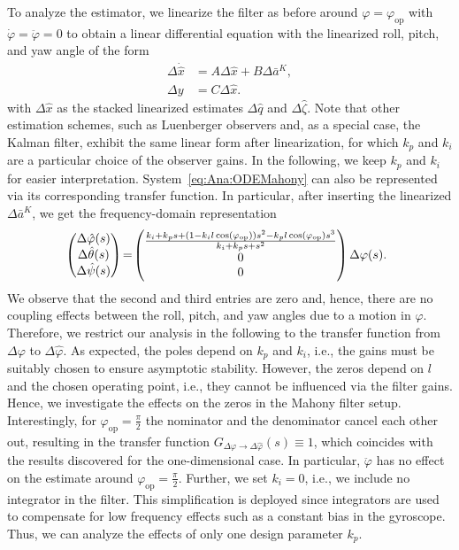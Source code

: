 To analyze the estimator, we linearize the filter as before around $\varphi=\varphi_{\mathrm{op}}$ with $\dot{\varphi}=\ddot\varphi=0$ to obtain a linear differential equation with the linearized roll, pitch, and yaw angle of the 
form
\begin{equation}\label{eq:Ana:ODEMahony}
	\begin{aligned}
		\Delta\dot{\hat{x}} 	&= A\Delta \hat{x} + B \Delta \bar{a}^K, \\
		\Delta y 		&= C\Delta \hat{x}.		
	\end{aligned}
\end{equation}
with $\Delta\hat{x}$ as the stacked linearized estimates $\Delta\hat{q}$ and $\Delta\hat{\zeta}$. Note that other estimation schemes, such as Luenberger observers and, as a special case, the Kalman filter, exhibit the same linear form after linearization, for which $k_p$ and $k_i$ are a particular choice of the observer gains.
In the following, we keep $k_p$ and $k_i$ for easier interpretation.
System~\eqref{eq:Ana:ODEMahony} can also be represented via its corresponding transfer function. 
In particular, after inserting the linearized $\Delta \bar{a}^K$, we get the frequency-domain representation%
\small
\begin{equation*}
	\hspace*{-0.015\linewidth}
	\begin{pmatrix}
		\Delta \hat{\varphi}(s) \\
		\Delta \hat{\theta}(s) \\
		\Delta \hat{\psi}(s)
	\end{pmatrix} 
	\!=\! 
	\begin{pmatrix}
		\frac{k_i + k_ps + (1-k_il\cos(\varphi_{\mathrm{op}}))s^2 - k_pl\cos(\varphi_{\mathrm{op}})s^3}{k_i + k_ps + s^2} \\ 
		0 \\
		0 
	\end{pmatrix} \Delta \varphi(s).
\end{equation*}
\normalsize
We observe that the second and third entries are zero and, hence, there are no coupling effects between the roll, pitch, and yaw angles due to a motion in $\varphi$.
Therefore, we restrict our analysis in the following to the transfer function from $\Delta\varphi$ to $\Delta\hat{\varphi}$.
As expected, the poles depend on $k_p$ and $k_i$, i.e., the gains must be suitably chosen to ensure asymptotic stability.
However, the zeros depend on $l$ and the chosen operating point, i.e., they cannot be influenced via the filter gains.
Hence, we investigate the effects on the zeros in the Mahony filter setup.
Interestingly, for $\varphi_{\mathrm{op}}=\frac{\pi}{2}$ the nominator and the denominator cancel each other out, resulting in the transfer function $G_{\Delta \varphi \to \Delta \hat{\varphi}}(s) \equiv 1$, which coincides with the results discovered for the one-dimensional case.
In particular, $\ddot{\varphi}$ has no effect on the estimate around $\varphi_\mathrm{op}=\frac{\pi}{2}$.
Further, we set $k_i=0$, i.e., we include no integrator in the filter.
This simplification is deployed since integrators are used to compensate for low frequency effects such as a constant bias in the gyroscope.
Thus, we can analyze the effects of only one design parameter $k_p$.

